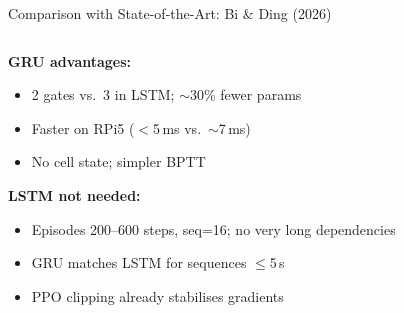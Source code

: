 \documentclass[aspectratio=169, 10pt]{beamer}
\begin{document}
\begin{frame}{Comparison with State-of-the-Art: Bi \& Ding (2026)}
\begin{columns}[T]
\begin{tcolorbox}[mycard, title={\faMicrochip\; Why GRU not LSTM?}]
  \tiny
  \textbf{GRU advantages:}
  \begin{itemize}[leftmargin=1em, itemsep=2pt]
    \item 2 gates vs.\ 3 in LSTM; $\sim$30\% fewer params
    \item Faster on RPi5 ($<$5\,ms vs.\ $\sim$7\,ms)
    \item No cell state; simpler BPTT
  \end{itemize}
  \vspace{3pt}
  \textbf{LSTM not needed:}
  \begin{itemize}[leftmargin=1em, itemsep=2pt]
    \item Episodes 200--600 steps, seq=16; no very long dependencies
    \item GRU matches LSTM for sequences $\le$5\,s
    \item PPO clipping already stabilises gradients
  \end{itemize}
\end{tcolorbox}
\end{columns}
\end{frame}
\end{document}
